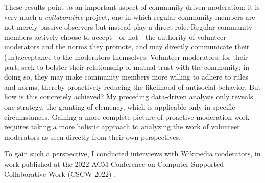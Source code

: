 \documentclass[11pt,letterpaper]{article}
\begin{document}
These results point to an important aspect of community-driven moderation: it is very much a \emph{collaborative} project, one in which regular community members are not merely passive observers but instead play a direct role.
Regular community members actively choose to accept---or not---the authority of volunteer moderators and the norms they promote, and may directly communicate their (un)acceptance to the moderators themselves.
Volunteer moderators, for their part, seek to bolster their relationship of mutual trust with the community; in doing so, they may make community members more willing to adhere to rules and norms, thereby proactively reducing the likelihood of antisocial behavior.
But how is this concretely achieved?
My preceding data-driven analysis only reveals one strategy, the granting of clemency, which is applicable only in specific circumstances.
Gaining a more complete picture of proactive moderation work requires taking a more holistic approach to analyzing the work of volunteer moderators as seen directly from their own perspectives.

To gain such a perspective, I conducted interviews with Wikipedia moderators, in work published at the 2022 ACM Conference on Computer-Supported Collaborative Work (CSCW 2022) \cite{schluger_proactive_2022}.

\vspace{\baselineskip}


\end{document}
